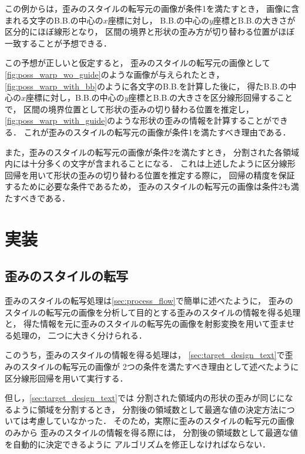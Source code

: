 \documentclass[\homedir/main.tex]{subfiles}
\begin{document}
この例からは，歪みのスタイルの転写元の画像が条件1を満たすとき，
画像に含まれる文字のB.B.の中心の$x$座標に対し，
B.B.の中心の$y$座標とB.B.の大きさが区分的にほぼ線形となり，
区間の境界と形状の歪み方が切り替わる位置がほぼ一致することが予想できる．

この予想が正しいと仮定すると，
歪みのスタイルの転写元の画像として\cref{fig:poss_warp_wo_guide}のような画像が与えられたとき，
\cref{fig:poss_warp_with_bb}のように各文字のB.B.を計算した後に，
得たB.B.の中心の$x$座標に対し，B.B.の中心の$y$座標とB.B.の大きさを区分線形回帰することで，
区間の境界位置として形状の歪みの切り替わる位置を推定し，
\cref{fig:poss_warp_with_guide}のような形状の歪みの情報を計算することができる．
これが歪みのスタイルの転写元の画像が条件1を満たすべき理由である．

また，歪みのスタイルの転写元の画像が条件2を満たすとき，
分割された各領域内には十分多くの文字が含まれることになる．
これは上述したように区分線形回帰を用いて形状の歪みの切り替わる位置を推定する際に，
回帰の精度を保証するために必要な条件であるため，
歪みのスタイルの転写元の画像は条件2も満たすべきである．


\section{実装}\label{sec:implementation}
\subsection{歪みのスタイルの転写}\label{sec:warp_style_transfer}
歪みのスタイルの転写処理は\cref{sec:process_flow}で簡単に述べたように，
歪みのスタイルの転写元の画像を分析して目的とする歪みのスタイルの情報を得る処理と，
得た情報を元に歪みのスタイルの転写先の画像を射影変換を用いて歪ませる処理の，
二つに大きく分けられる．

このうち，歪みのスタイルの情報を得る処理は，
\cref{sec:target_design_text}で歪みのスタイルの転写元の画像が
2つの条件を満たすべき理由として述べたように区分線形回帰を用いて実行する．

但し，\cref{sec:target_design_text}では
分割された領域内の形状の歪みが同じになるように領域を分割するとき，
分割後の領域数として最適な値の決定方法については考慮していなかった．
そのため，実際に歪みのスタイルの転写元の画像のみから
歪みのスタイルの情報を得る際には，
分割後の領域数として最適な値を自動的に決定できるように
アルゴリズムを修正しなければならない．
\end{document}
